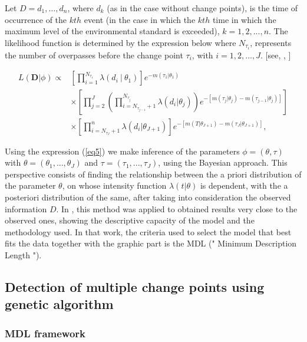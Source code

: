\documentclass[APA,STIX1COL]{WileyNJD-v2}
\begin{document}

Let $D={d_1,\ldots ,d_n}$, where $d_k$ (as in the case without change points), is the time of occurrence of the $kth$ event (in the case in which the $kth$ time in which the maximum level of the environmental standard is exceeded), $k=1,2,...,n$.  The likelihood function is determined by the expression below
where $N_{\tau_i}$, represents the number of overpasses before the change point $\tau_i$, with $i=1,2,...,J$. [see, \cite{Yang}, \cite{Achcar11}]


\begin{align}
	\label{eq5}
	L(\mathbf{D}|\phi) \propto &  \left[\prod_{i=1}^{N_{\tau_1}}\lambda(d_i\ | \ \theta_1) \right]e^{-m(\tau_1 | \theta_1)}\nonumber\\
	& \times \left[ \prod_{j=2}^{J} \left( \prod_{i=N_{\tau_{j-1}}+1}^{N_{\tau_j}}\lambda(d_i |\theta_j)\right)e^{-[m(\tau_j |\theta_j)-m(\tau_{j-1} | \theta_j )]}  \right]\nonumber\\
	& \times \left[\prod_{i=N_{\tau_{J}}+1}^{n}\lambda(d_i|\theta_{J+1})\right]e^{-[m(T |\theta_{J+1})-m(\tau_{J}|\theta_{J+1} )]},
\end{align}


Using the expression (\ref{eq5}) we make inference of the parameters $\phi=(\theta, \tau)$ with $\theta=(\theta_1,...,\theta_J)$ and $\tau=(\tau_1,...,\tau_J)$, using the Bayesian approach. This perspective consists of finding the relationship between the a priori distribution of the parameter $\theta$, on whose intensity function $\lambda(t|\theta)$ is dependent, with the a posteriori distribution of the same, after taking into consideration the observed information $D$. In \cite{Achcar10}, this method was applied to obtained results very close to the observed ones, showing the descriptive capacity of the model and the methodology used. In that work, the criteria used to select the model that best fits the data together with the graphic part is the MDL (" Minimum Description Length ").


\subsection{Detection of multiple change points using genetic algorithm}

\subsubsection{MDL framework}	
\end{document}
